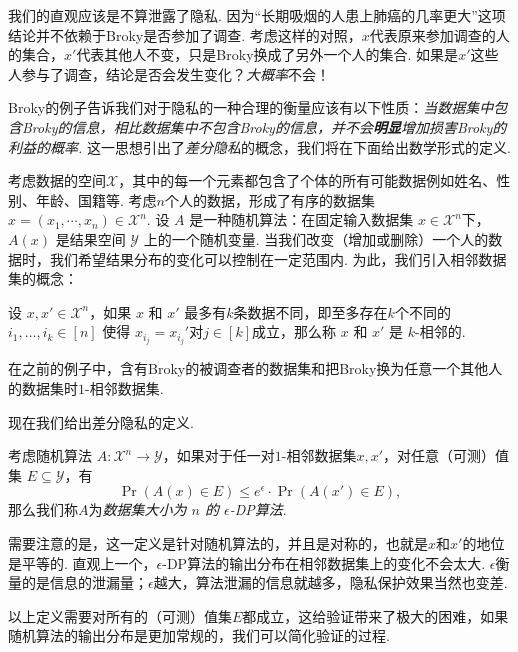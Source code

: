 我们的直观应该是不算泄露了隐私. 因为“长期吸烟的人患上肺癌的几率更大”这项结论并不依赖于Broky是否参加了调查. 考虑这样的对照，$x$代表原来参加调查的人的集合，$x'$代表其他人不变，只是Broky换成了另外一个人的集合. 如果是$x'$这些人参与了调查，结论是否会发生变化？\emph{大概率}不会！

Broky的例子告诉我们对于隐私的一种合理的衡量应该有以下性质：\emph{当数据集中包含Broky的信息，相比数据集中不包含Broky的信息，并不会\textbf{明显}增加损害Broky的利益的概率.} 这一思想引出了\emph{差分隐私}的概念，我们将在下面给出数学形式的定义.

考虑数据的空间$\mathcal X$，其中的每一个元素都包含了个体的所有可能数据例如姓名、性别、年龄、国籍等. 考虑$n$个人的数据，形成了有序的数据集$x = (x_1, \cdots, x_n) \in \mathcal X^n$.  设 $A$ 是一种随机算法：在固定输入数据集 $x \in \mathcal X^n$下，$A(x)$ 是结果空间 $\mathcal Y$ 上的一个随机变量. 当我们改变（增加或删除）一个人的数据时，我们希望结果分布的变化可以控制在一定范围内. 为此，我们引入相邻数据集的概念：

\begin{definition}[$k$-相邻数据集]
    设 $x, x' \in \mathcal X^n$，如果 $x$ 和 $x'$ 最多有$k$条数据不同，即至多存在$k$个不同的$i_1,\dots,i_k \in [n]$ 使得 $x_{i_j}=x_{i_j}'$对$j\in[k]$成立，那么称 $x$ 和 $x'$ 是 $k$-相邻的.
\end{definition}

在之前的例子中，含有Broky的被调查者的数据集和把Broky换为任意一个其他人的数据集时$1$-相邻数据集.

现在我们给出差分隐私的定义. 

\begin{definition}[$\epsilon$-DP]
考虑随机算法 $A : \mathcal X^n \to \mathcal Y$，如果对于任一对$1$-相邻数据集$x, x'$，对任意（可测）值集 $E \subseteq \mathcal Y$，有
\[
\Pr(A(x)\in E) \leq e^{\epsilon} \cdot \Pr(A(x')\in E),
\]
那么我们称$A$为\emph{数据集大小为 $n$ 的 $\epsilon$-DP算法}.
\end{definition}

需要注意的是，这一定义是针对随机算法的，并且是对称的，也就是$x$和$x'$的地位是平等的. 直观上一个，$\epsilon$-DP算法的输出分布在相邻数据集上的变化不会太大. $\epsilon$衡量的是信息的泄漏量；$\epsilon$越大，算法泄漏的信息就越多，隐私保护效果当然也变差.

以上定义需要对所有的（可测）值集$E$都成立，这给验证带来了极大的困难，如果随机算法的输出分布是更加常规的，我们可以简化验证的过程. 

